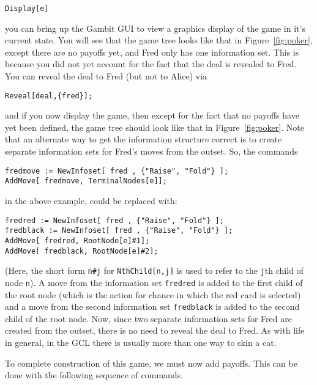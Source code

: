 \begin{verbatim}
Display[e]
\end{verbatim}

\noindent
you can bring up the Gambit GUI to view a graphics display of the game
in it's current state. You will see that the game tree looks like that
in Figure~\ref{fig:poker}, except there are no payoffs yet, and Fred
only has one information set.  This is because you did not yet account
for the fact that the deal is revealed to Fred.  You can reveal the
deal to Fred (but not to Alice) via

\begin{verbatim}
Reveal[deal,{fred}];
\end{verbatim}

\noindent
and if you now display the game, then except for the fact that no
payoffs have yet been defined, the game tree should look like that in
Figure~\ref{fig:poker}.  Note that an alternate way to get the
information structure correct is to create separate information sets
for Fred's moves from the outset.  So, the commands 

\begin{verbatim}
fredmove := NewInfoset[ fred , {"Raise", "Fold"} ];
AddMove[ fredmove, TerminalNodes[e]];
\end{verbatim}

\noindent
in the above example, could be replaced with:

\begin{verbatim}
fredred := NewInfoset[ fred , {"Raise", "Fold"} ];
fredblack := NewInfoset[ fred , {"Raise", "Fold"} ];
AddMove[ fredred, RootNode[e]#1];
AddMove[ fredblack, RootNode[e]#2];
\end{verbatim}

\noindent
(Here, the short form \verb+n#j+ for \verb+NthChild[n,j]+ is used to
refer to the \verb+j+th child of node \verb+n+).  A move from the
information set \verb+fredred+ is added to the first child of the root
node (which is the action for chance in which the red card is
selected) and a move from the second information set \verb+fredblack+
is added to the second child of the root node.  Now, since two
separate information sets for Fred are created from the outset, there
is no need to reveal the deal to Fred.  As with life in general, in
the GCL there is usually more than one way to skin a cat.

To complete construction of this game, we must now add payoffs. This
can be done with the following sequence of commands. 

